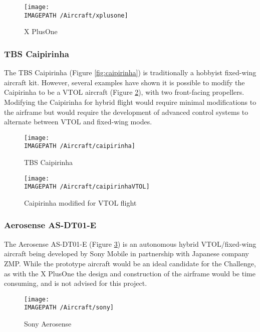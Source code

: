 \begin{figure}[!ht]
	\centering
	\texttt{[image: \\IMAGEPATH /Aircraft/xplusone]}
	\caption{X PlusOne}
	\label{fig:xplusone}
\end{figure}

\subsubsection*{TBS Caipirinha}
The TBS Caipirinha\cite{ref:caipirinha} (Figure \ref{fig:caipirinha}) is traditionally a hobbyist fixed-wing aircraft kit. However, several examples have shown it is possible to modify the Caipirinha to be a VTOL aircraft\cite{ref:caipirinhaVTOL} (Figure \ref{fig:caipirinhaVTOL}), with two front-facing propellers. Modifying the Caipirinha for hybrid flight would require minimal modifications to the airframe but would require the development of advanced control systems to alternate between VTOL and fixed-wing modes.

\begin{figure}[!ht]
	\centering
	\begin{minipage}{.5\textwidth}
		\centering
		\texttt{[image: \\IMAGEPATH /Aircraft/caipirinha]}
		\caption{TBS Caipirinha}
		\label{fig:caipirinha}
	\end{minipage}%
	\begin{minipage}{.5\textwidth}
		\centering
		\texttt{[image: \\IMAGEPATH /Aircraft/caipirinhaVTOL]}
		\caption{Caipirinha modified for VTOL flight}
		\label{fig:caipirinhaVTOL}
	\end{minipage}
\end{figure}

\subsubsection*{Aerosense AS-DT01-E}
The Aerosense AS-DT01-E\cite{ref:sony} (Figure \ref{fig:sony}) is an autonomous hybrid VTOL/fixed-wing aircraft being developed by Sony Mobile in partnership with Japanese company ZMP. While the prototype aircraft would be an ideal candidate for the Challenge, as with the X PlusOne the design and construction of the airframe would be time consuming, and is not advised for this project.

\begin{figure}[!ht]
	\centering
	\texttt{[image: \\IMAGEPATH /Aircraft/sony]}
	\caption{Sony Aerosense}
	\label{fig:sony}
\end{figure}

